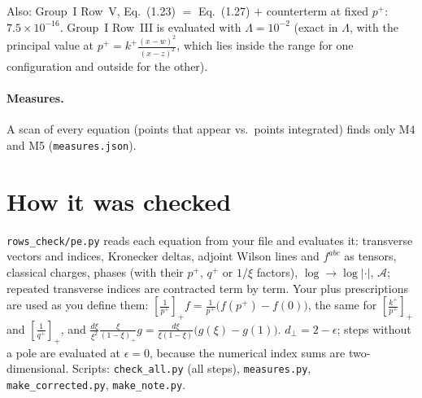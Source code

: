 \documentclass[10pt]{article}
\begin{document}
\noindent Also: Group~I Row~V, Eq.~(1.23) $=$ Eq.~(1.27) $+$ counterterm at fixed $p^+$: $7.5\times10^{-16}$. Group~I Row~III is evaluated with $\Lambda=10^{-2}$ (exact in $\Lambda$, with the principal value at $p^+=k^+\frac{(x-w)^2}{(x-z)^2}$, which lies inside the range for one configuration and outside for the other).

\paragraph{Measures.} A scan of every equation (points that appear vs.\ points integrated) finds only M4 and M5 (\texttt{measures.json}).

\section{How it was checked}
\texttt{rows\_check/pe.py} reads each equation from your file and evaluates it: transverse vectors and indices, Kronecker deltas, adjoint Wilson lines and $f^{abc}$ as tensors, classical charges, phases (with their $p^+$, $q^+$ or $1/\xi$ factors), $\log\to\log|\cdot|$, $\mathcal A$; repeated transverse indices are contracted term by term. Your plus prescriptions are used as you define them: $\left[\frac{1}{p^+}\right]_+f=\frac{1}{p^+}\big(f(p^+)-f(0)\big)$, the same for $\left[\frac{k^+}{p^+}\right]_+$ and $\left[\frac{1}{q^+}\right]_+$, and $\frac{d\xi}{\xi^2}\frac{\xi}{(1-\xi)_+}g=\frac{d\xi}{\xi(1-\xi)}\big(g(\xi)-g(1)\big)$. $d_\perp=2-\epsilon$; steps without a pole are evaluated at $\epsilon=0$, because the numerical index sums are two-dimensional. Scripts: \texttt{check\_all.py} (all steps), \texttt{measures.py}, \texttt{make\_corrected.py}, \texttt{make\_note.py}.
\end{document}
